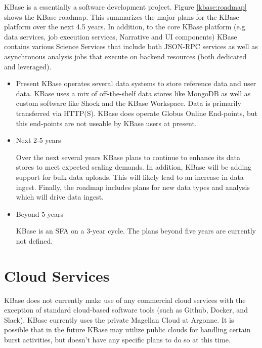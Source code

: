\documentclass[10pt,a4paper]{report}
\begin{document}
KBase is a essentially a software development project.  Figure \ref{kbase:roadmap} shows the KBase roadmap.  This summarizes the major plans for the KBase platform over the next 4.5 years.  In addition, to the core KBase platform (e.g. data services, job execution services, Narrative and UI components) KBase contains various Science Services that include both JSON-RPC services as well as asynchronous analysis jobs that execute on backend resources (both dedicated and leveraged).

\begin{itemize}
\item Present
KBase operates several data systems to store reference data and user data.  KBase uses a mix of off-the-shelf data stores like MongoDB as well as custom software like Shock and the KBase Workspace.  Data is primarily transferred via HTTP(S). KBase does operate Globus Online End-points, but this end-points are not useable by KBase users at present.


\item Next 2-5 years

Over the next several years KBase plans to continue to enhance its data stores to meet expected scaling demands.  In addition, KBase will be adding support for bulk data uploads.  This will likely lead to an increase in data ingest.  Finally, the roadmap includes plans for new data types and analysis which will drive data ingest.

\item Beyond 5 years

KBase is an SFA on a 3-year cycle.  The plans beyond five years are currently not defined.
\end{itemize}

\section{Cloud Services}

KBase does not currently make use of any commercial cloud services with the exception of standard cloud-based software tools (such as Github, Docker, and Slack).  
KBase currently uses the private Magellan Cloud at Argonne.  It is possible that in the future KBase may utilize public clouds for handling certain burst activities, but doesn't have any specific plans to do so at this time.
\end{document}

